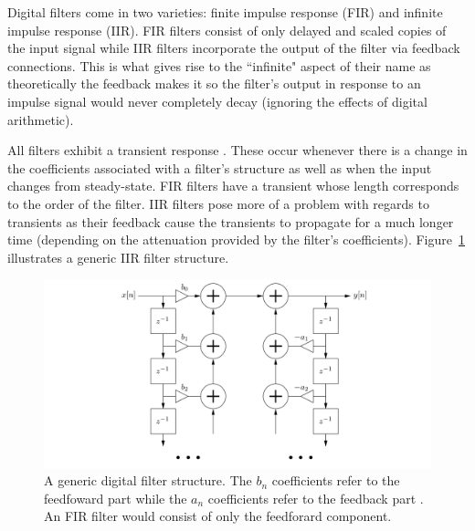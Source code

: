 \documentclass[main.tex]{subfiles}
\begin{document}
Digital filters come in two varieties: finite impulse response (FIR) and infinite impulse response (IIR). FIR filters consist of only delayed and scaled copies of the input signal while IIR filters incorporate the output of the filter via feedback connections. This is what gives rise to the ``infinite" aspect of their name as theoretically the feedback makes it so the filter's output in response to an impulse signal would never completely decay (ignoring the effects of digital arithmetic).

All filters exhibit a transient response . These occur whenever there is a change in the coefficients associated with a filter's structure as well as when the input changes from steady-state. FIR filters have a transient whose length corresponds to the order of the filter. IIR filters pose more of a problem with regards to transients as their feedback cause the transients to propagate for a much longer time (depending on the attenuation provided by the filter's coefficients). Figure~\ref{fig:generic_IIR} illustrates a generic IIR filter structure.

\begin{figure}[h]
    \centering
    \includegraphics[scale=.25]{./images/diagrams/digitalFilter.png}
    \caption{A generic digital filter structure. The $b_n$ coefficients refer to the feedfoward part while the $a_n$ coefficients refer to the feedback part . An FIR filter would consist of only the feedforard component.}
    \label{fig:generic_IIR}
\end{figure}
\end{document}
